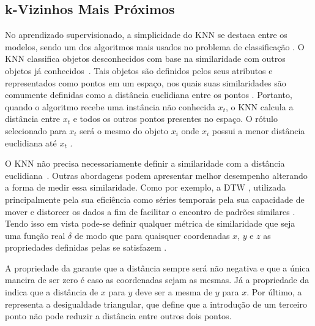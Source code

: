 \subsection{k-Vizinhos Mais Próximos}
\label{sec:knn}

No aprendizado supervisionado, a simplicidade do \acrfull{KNN} \cite{knn} se destaca entre os modelos, sendo um dos algoritmos mais usados no problema de classificação \cite{larose2014discovering}. O \acrshort{KNN} classifica objetos desconhecidos com base na similaridade com outros objetos já conhecidos~\cite{larose2014discovering}. Tais objetos são definidos pelos seus atributos e representados como pontos em um espaço, nos quais suas similaridades são comumente definidas como a distância euclidiana entre os pontos \cite{larose2014discovering}. Portanto, quando o algoritmo recebe uma instância não conhecida $x_t$, o \acrshort{KNN} calcula a distância entre $x_t$ e todos os outros pontos presentes no espaço. O rótulo selecionado para $x_t$ será o mesmo do objeto $x_i$ onde $x_i$ possui a menor distância euclidiana até $x_t$ \cite{faceli2011inteligencia}.

O \acrshort{KNN} não precisa necessariamente definir a similaridade com a distância euclidiana~\cite{larose2014discovering}. Outras abordagens podem apresentar melhor desempenho alterando a forma de medir essa similaridade. Como por exemplo, a \acrfull{DTW} \cite{dtw}, utilizada principalmente pela sua eficiência como séries temporais pela sua capacidade de mover e distorcer os dados a fim de facilitar o encontro de padrões similares \cite{senin2008dynamic}. Tendo isso em vista pode-se definir qualquer métrica de similaridade que seja uma função real $\delta$ de modo que para quaisquer coordenadas $x$, $y$ e $z$ as propriedades definidas pelas  se satisfazem \cite{larose2014discovering}.


A propriedade da  garante que a distância sempre será não negativa e que a única maneira de ser zero é caso as coordenadas sejam as mesmas. Já a propriedade da  indica que a distância de $x$ para $y$ deve ser a mesma de $y$ para $x$. Por último, a  representa a desigualdade triangular, que define que a introdução de um terceiro ponto não pode reduzir a distância entre outros dois pontos.

